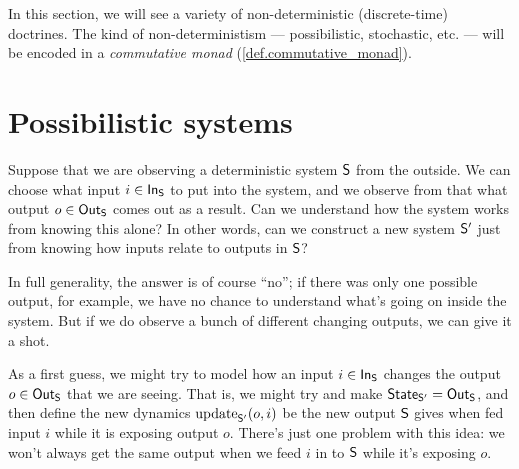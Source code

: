 \documentclass[DynamicalBook]{subfiles}
\begin{document}
In this section, we will see a variety of non-deterministic (discrete-time)
doctrines. The kind of non-deterministism --- possibilistic, stochastic, etc.
--- will be encoded in a \emph{commutative monad}
(\cref{def.commutative_monad}). 

\section{Possibilistic  systems}

Suppose that we are observing a deterministic system $\mathsf{S}$ from the outside.
We can choose what input $i \in \mathsf{In}_{\mathsf{S}}$ to put into the system, and we observe
from that what output $o \in \mathsf{Out}_{\mathsf{S}}$ comes out as a result. Can we understand
how the system works from knowing this alone? In other words, can we construct a
new system $\mathsf{S'}$ just from knowing how inputs relate to outputs in $\mathsf{S}$?

In full generality, the answer is of course ``no''; if there was only one
possible output, for example, we have no chance to understand what's going on
inside the system. But if we do observe a bunch of different changing outputs,
we can give it a shot.

As a first guess, we might try to model how an input $i \in \mathsf{In}_{\mathsf{S}}$ changes the
output $o \in \mathsf{Out}_{\mathsf{S}}$ that we are seeing. That is, we might try and make
$\mathsf{State}_{\mathsf{S'}} = \mathsf{Out}_{\mathsf{S}}$, and then define the new dynamics $\mathrm{update}_{\mathsf{S'}}(o, i)$ be
the new output $\mathsf{S}$ gives when fed input $i$ while it is exposing output
$o$. There's just one problem with this idea: we won't always get the same
output when we feed $i$ in to $\mathsf{S}$ while it's exposing $o$.
\end{document}
